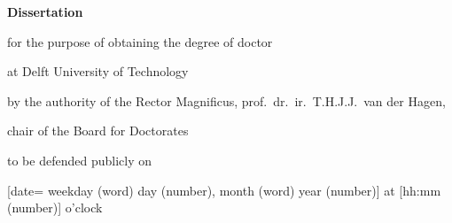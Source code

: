 \begin{titlepage}

\begin{center}

    \vspace*{2\bigskipamount}

    {\makeatletter
        \titlestyle\bfseries\LARGE\@title
        \makeatother}

    {\makeatletter
        \ifx\@subtitle\undefined\else
            \bigskip
            \titlefont\titleshape\Large\@subtitle
        \fi
        \makeatother}

\end{center}

\cleardoublepage
\thispagestyle{empty}

\begin{center}


    \vspace*{2\bigskipamount}

    {\makeatletter
        \titlestyle\bfseries\LARGE\@title
        \makeatother}

    {\makeatletter
        \ifx\@subtitle\undefined\else
            \bigskip
            \titlefont\titleshape\Large\@subtitle
        \fi
        \makeatother}

    \vfill


    {\Large\titlefont\bfseries Dissertation}

    \bigskip
    \bigskip

    for the purpose of obtaining the degree of doctor

    at Delft University of Technology

    by the authority of the Rector Magnificus, prof.~dr.~ir.~T.H.J.J.~van der Hagen,

    chair of the Board for Doctorates

    to be defended publicly on

        [date= weekday (word) day (number), month (word) year (number)] at [hh:mm (number)] o'clock


\end{center}
\end{titlepage}
